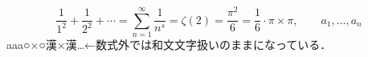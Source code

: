 \documentclass{article}
\begin{document}
\makeatletter

\[
 \frac1{1^2}+\frac1{2^2}+\cdots=
\sum_{n=1}^\infty \frac1{n^s}=\zeta(2)=\frac{\pi^2}{6}
=\frac16\cdot \pi\times\pi,\qquad a_1,\dots,a_n
\]
aaa○×○漢×漢\times \dots←数式外では和文文字扱いのままになっている．
\end{document}
